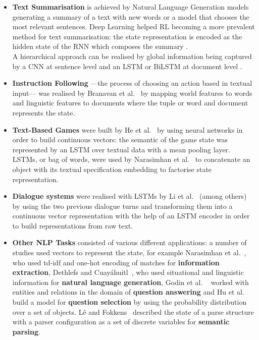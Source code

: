 \documentclass[11pt]{article}
\begin{document}
\begin{itemize}


\item \textbf{Text Summarisation} is achieved by Natural Language Generation models generating a summary of a text with new words or a model that chooses the most relevant sentences. Deep Learning helped RL becoming a more prevalent method for text summarisation: the state representation is encoded as the hidden state of the RNN which composes the summary \cite{ling-etal-2017-learning}. \\ A hierarchical approach can be realised by global information being captured by a CNN at sentence level and an LSTM or BiLSTM at document level \cite{chen-bansal-2018-fast}.
\item \textbf{Instruction Following} ---the process of choosing an action based in textual input--- was realised by Branavan et al.~ by mapping world features to words and linguistic features to documents where the tuple or word and document represents the state.
\item \textbf{Text-Based Games} were built by He et al.~ by using neural networks in order to build continuous vectors: the semantic of the game state was represented by an LSTM over textual data with a mean pooling layer.\\ LSTMs, or bag of words, were used by Narasimhan et al.~ to concatenate an object with its textual specification embedding to factorise state representation.
\item \textbf{Dialogue systems} were realised with LSTMs by Li et al.~ (among others) by using the two previous dialogue turns and transforming them into a continuous vector representation with the help of an LSTM encoder in order to build representations from raw text. 
\item \textbf{Other NLP Tasks} consisted of various different applications: a number of studies used vectors to represent the state, for example Narasimhan et al.~, who used td-idf and one-hot encoding of matches for \textbf{information extraction}, Dethlefs and Cuayáhuitl~, who used situational and linguistic information for \textbf{natural language generation}, Godin et al.
~ worked with entities and relations in the domain of \textbf{question answering} and Hu et al.~ build a model for \textbf{question selection} by using the probability distribution over a set of objects. Lê and Fokkens~ described the state of a parse structure with a parser configuration as a set of discrete variables for \textbf{semantic parsing}.

\end{itemize}
\end{document}
